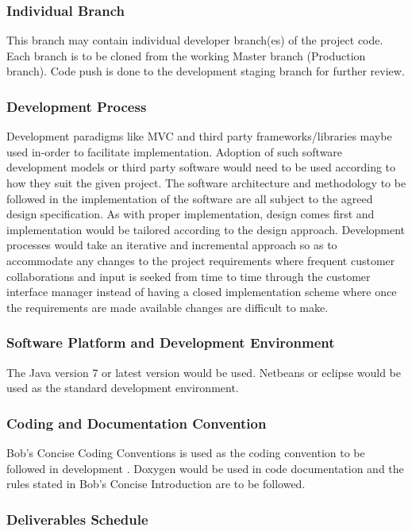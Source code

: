 \documentclass{article}
\begin{document}
\subsubsection{Individual Branch}
This branch may contain individual developer branch(es) of the project code. Each branch is to be cloned from the working Master branch (Production branch). Code push is done to the development staging branch for further review.
\subsubsection{Development Process}
Development paradigms like MVC and third party frameworks/libraries maybe used in-order to facilitate implementation. Adoption of such software development models or third party software would need to be used according to how they suit the given project. The software architecture and methodology to be followed in the implementation of the software are all subject to the agreed design specification. As with proper implementation, design comes first and implementation would be tailored according to the design approach. Development processes would take an iterative and incremental approach so as to accommodate any changes to the project requirements where frequent customer collaborations and input is seeked from time to time through the customer interface manager instead of having a closed implementation scheme where once the requirements are made available changes are difficult to make.

\subsubsection{Software Platform and Development Environment}
The Java version 7 or latest version would be used. Netbeans or eclipse would be used as the standard development environment.
\subsubsection{Coding and Documentation Convention}
Bob's Concise Coding Conventions is used as the coding convention to be followed in development \cite{bobs3cs}. Doxygen would be used in code documentation and the rules stated in Bob's Concise Introduction are to be followed.

\subsubsection{Deliverables Schedule}
\end{document}
